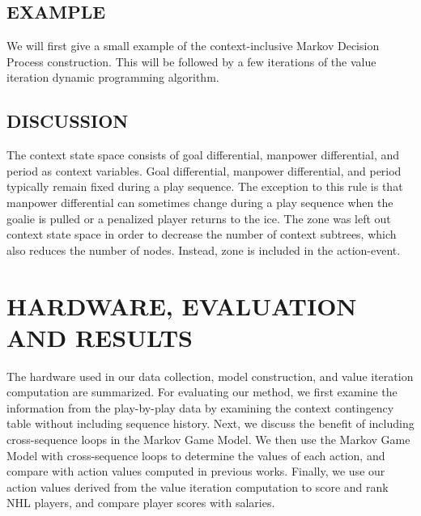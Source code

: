 \documentclass[]{article}
\begin{document}
\subsection{EXAMPLE}

We will first give a small example of the context-inclusive Markov Decision Process construction. This will be followed by a few iterations of the value iteration dynamic programming algorithm.





\subsection{DISCUSSION}

The context state space consists of goal differential, manpower differential, and period as context variables. Goal differential, manpower differential, and period typically remain fixed during a play sequence. The exception to this rule is that manpower differential can sometimes change during a play sequence when the goalie is pulled or a penalized player returns to the ice. The zone was left out context state space in order to decrease the number of context subtrees, which also reduces the number of nodes. Instead, zone is included in the action-event. %


\section{HARDWARE, EVALUATION AND RESULTS}

The hardware used in our data collection, model construction, and value iteration computation are summarized. For evaluating our method, we first examine the information from the play-by-play data by examining the context contingency table without including sequence history. Next, we discuss the benefit of including cross-sequence loops in the Markov Game Model. We then use the Markov Game Model with cross-sequence loops to determine the values of each action, and compare with action values computed in previous works. Finally, we use our action values derived from the value iteration computation to score and rank NHL players, and compare player scores with salaries.
\end{document}
